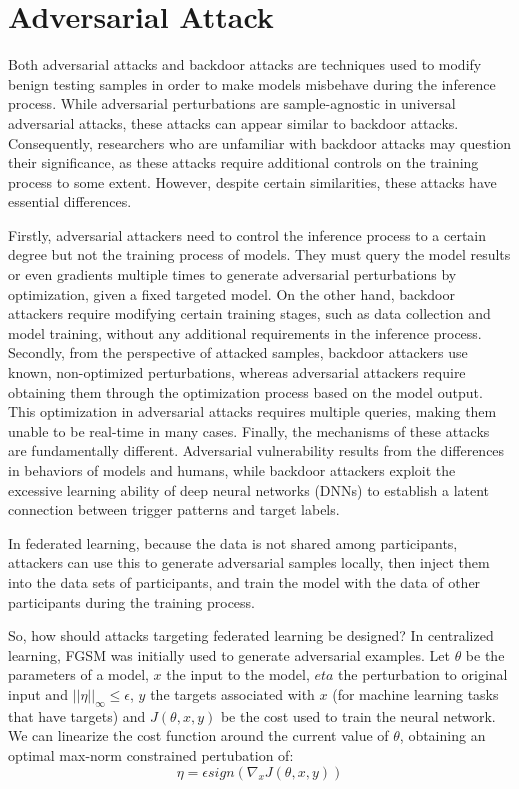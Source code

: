 \documentclass[conference]{IEEEtran}
\begin{document}
\section{Adversarial Attack}  

Both adversarial attacks and backdoor attacks are techniques used to modify benign testing samples
in order to make models misbehave during the inference process. While adversarial perturbations are sample-agnostic in universal adversarial attacks,
these attacks can appear similar to backdoor attacks. Consequently, researchers who are unfamiliar with backdoor attacks may question their significance,
as these attacks require additional controls on the training process to some extent.
However, despite certain similarities, these attacks have essential differences.

Firstly, adversarial attackers need to control the inference process to a certain degree
but not the training process of models. They must query the model results or even gradients multiple
times to generate adversarial perturbations by optimization, given a fixed targeted model.
On the other hand, backdoor attackers require modifying certain training stages,
such as data collection and model training, without any additional requirements in the inference process.
Secondly, from the perspective of attacked samples, backdoor attackers use known,
non-optimized perturbations, whereas adversarial attackers require obtaining
them through the optimization process based on the model output.
This optimization in adversarial attacks requires multiple queries,
making them unable to be real-time in many cases.
Finally, the mechanisms of these attacks are fundamentally different.
Adversarial vulnerability results from the differences in behaviors of models and humans,
while backdoor attackers exploit the excessive learning ability of deep neural networks (DNNs)
to establish a latent connection between trigger patterns and target labels.

In federated learning, because the data is not shared among participants,
attackers can use this to generate adversarial samples locally,
then inject them into the data sets of participants, and train
the model with the data of other participants during the training process.

So, how should attacks targeting federated learning be designed?
In centralized learning, FGSM\cite{b99} was initially used to generate adversarial examples.
Let $\theta$ be the parameters of a model, $x$ the input to the model,
$eta$ the perturbation to original input and $||\eta||_\infty \le \epsilon$,
$y$ the targets associated with $x$ (for machine learning tasks that have targets)
and $J(\theta, x, y)$ be the cost used to train the neural network.
We can linearize the cost function around the current value of $\theta$,
obtaining an optimal max-norm constrained pertubation of:
\begin{equation}
    \eta = \epsilon sign(\nabla_x J(\theta,x,y))
\end{equation}
\end{document}
